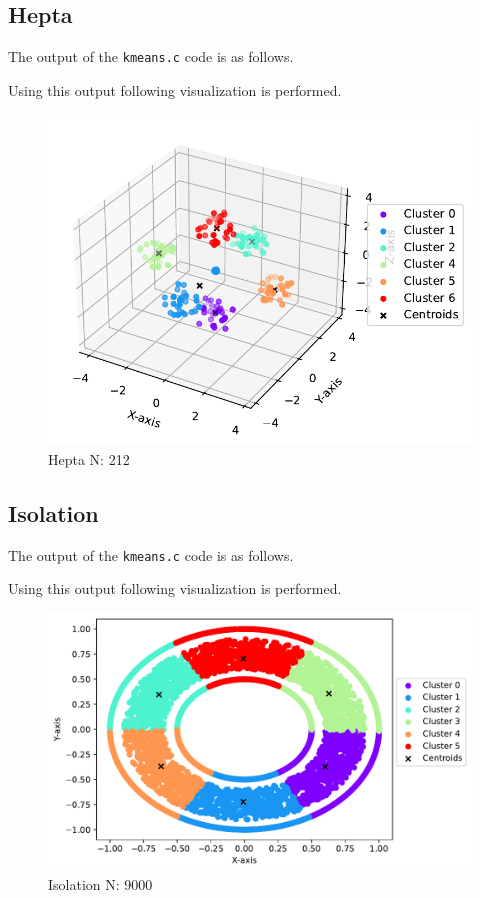 \subsection{Hepta}
The output of the \texttt{kmeans.c} code is as follows.


Using this output following visualization is performed.
\begin{figure}[H]
    \centering
    \includegraphics[width=.8\textwidth]{figures/plots/hepta.pdf}
    \caption{Hepta N: 212}
    \label{hepta}
\end{figure}

\subsection{Isolation}
The output of the \texttt{kmeans.c} code is as follows.


Using this output following visualization is performed.
\begin{figure}[H]
    \centering
    \includegraphics[width=.8\textwidth]{figures/plots/isolation.pdf}
    \caption{Isolation N: 9000}
    \label{isolation}
\end{figure}

